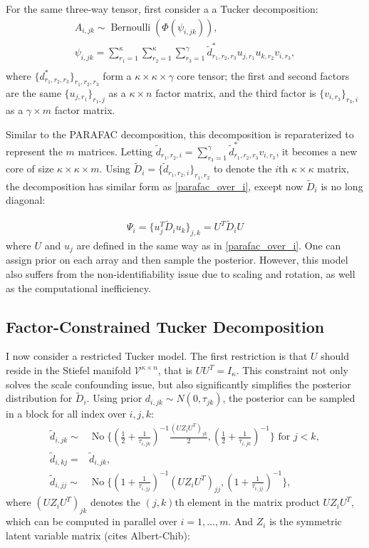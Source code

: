 \documentclass[10pt]{article}
\newcommand{\be}{\begin{equation}\begin{aligned}}
\newcommand{\ee}{\end{aligned}\end{equation}}
\newcommand{\mc}[1]{\mathcal{#1}}
\DeclareMathOperator{\No}{No}
\DeclareMathOperator{\Bern}{Bernoulli}
\begin{document}
For the same three-way tensor, first consider a a Tucker decomposition:
\be
A_{i,jk} \sim \Bern(\Phi( \psi_{i,jk})),\\
\psi_{i,jk}= \sum_{r_1=1}^{\kappa} \sum_{r_2=1}^{\kappa} \sum_{r_3=1}^{\gamma}\tilde d^*_{r_1,r_2, r_3}  u_{j,r_1} u_{k,r_2} v_{i, r_3},\\
\ee
where $\{d^*_{r_1,r_2, r_3}\}_{r_1,r_2, r_3}$ form a $\kappa \times \kappa \times \gamma$ core tensor; the first and second factors are the same $\{u_{j,r_1}\}_{r_1,j}$ as a $\kappa\times n$ factor matrix, and the third factor is $\{v_{i,r_3}\}_{r_3,i}$ as a $\gamma \times m$ factor matrix.

Similar to the PARAFAC decomposition, this decomposition is reparaterized to represent the $m$ matrices. Letting $\tilde d_{r_1,r_2,i}=\sum_{r_3=1}^{\gamma}\tilde d^*_{r_1,r_2, r_3}v_{i, r_3}$, it becomes a new core of size $\kappa \times \kappa \times m$. Using $\tilde D_i = \{\tilde d_{r_1,r_2,i}\}_{r_1,r_2}$ to denote the $i$th $\kappa \times \kappa$ matrix, the decomposition has similar form as \eqref{parafac_over_i}, except now $\tilde D_{i}$ is no long diagonal:

\be
\Psi_{i}= \{ u_{j}^T  \tilde D_{i} u_{k}\}_{j,k} = U^T \tilde D_iU
\ee
where $U$ and $u_{j}$ are defined in the same way as in \eqref{parafac_over_i}. One can assign prior on each array and then sample the posterior. However, this model also suffers from the non-identifiability issue due to scaling and rotation, as well as the computational inefficiency.

\subsection{Factor-Constrained Tucker Decomposition}

I now consider  a restricted Tucker model. The first restriction is that $U$ should reside in the Stiefel manifold $\mc V^{\kappa \times n}$, that is $U U^T = I_\kappa$. This constraint not only solves the scale confounding issue, but also significantly simplifies the posterior distribution for $\tilde D_{i}$. Using prior $d_{i,jk}\sim N(0, \tau_{jk})$, the posterior can be sampled in a block for all index over $i,j,k$:
\be
\tilde d_{i,jk} \sim& \No\{    (\frac{1}{2}+ \frac{1}{\tau_{i,jk}})^{-1} \frac{(UZ_iU^T)_{jk}}{2} ,(\frac{1}{2}+ \frac{1}{\tau_{i,jk}})^{-1}\} \text { for } j<k, \\
\tilde d_{i,kj} =& \tilde d_{i,jk} ,\\
\tilde d_{i,jj} \sim & \No\{    ({1}+ \frac{1}{\tau_{i,jj}})^{-1} (UZ_iU^T)_{jj}, ({1}+ \frac{1}{\tau_{i,jj}})^{-1} \},
\ee
where $(UZ_iU^T)_{jk}$ denotes the $(j,k)$th element in the matrix product $UZ_iU^T$, which can be computed in parallel over $i=1,\ldots, m$.
 And $Z_i$ is the symmetric latent variable matrix (cites Albert-Chib):
\end{document}
